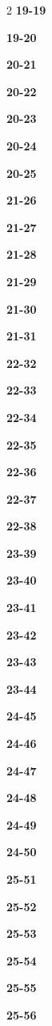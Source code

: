 \documentclass[10pt,a4paper]{article}
\begin{document}
\begin{multicols}{2}
\noindent\textbf{19-19}\ \par
\noindent\textbf{19-20}\ \par
\noindent\textbf{20-21}\ \par
\noindent\textbf{20-22}\ \par
\noindent\textbf{20-23}\ \par
\noindent\textbf{20-24}\ \par
\noindent\textbf{20-25}\ \par
\noindent\textbf{21-26}\ \par
\noindent\textbf{21-27}\ \par
\noindent\textbf{21-28}\ \par
\noindent\textbf{21-29}\ \par
\noindent\textbf{21-30}\ \par
\noindent\textbf{21-31}\ \par
\noindent\textbf{22-32}\ \par
\noindent\textbf{22-33}\ \par
\noindent\textbf{22-34}\ \par
\noindent\textbf{22-35}\ \par
\noindent\textbf{22-36}\ \par
\noindent\textbf{22-37}\ \par
\noindent\textbf{22-38}\ \par
\noindent\textbf{23-39}\ \par
\noindent\textbf{23-40}\ \par
\noindent\textbf{23-41}\ \par
\noindent\textbf{23-42}\ \par
\noindent\textbf{23-43}\ \par
\noindent\textbf{23-44}\ \par
\noindent\textbf{24-45}\ \par
\noindent\textbf{24-46}\ \par
\noindent\textbf{24-47}\ \par
\noindent\textbf{24-48}\ \par
\noindent\textbf{24-49}\ \par
\noindent\textbf{24-50}\ \par
\noindent\textbf{25-51}\ \par
\noindent\textbf{25-52}\ \par
\noindent\textbf{25-53}\ \par
\noindent\textbf{25-54}\ \par
\noindent\textbf{25-55}\ \par
\noindent\textbf{25-56}\ \par

\end{multicols}
\end{document}
